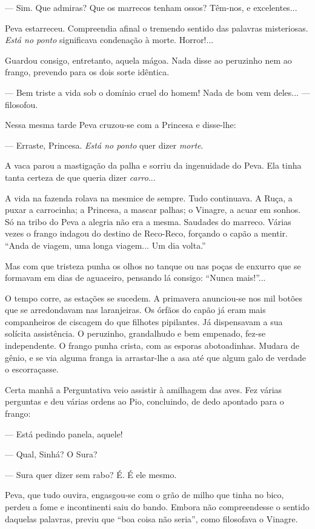 --- Sim. Que admiras? Que os marrecos tenham ossos? Têm-nos, e
excelentes...

Peva estarreceu. Compreendia afinal o tremendo sentido das palavras
misteriosas. \emph{Está no ponto} significava condenação à morte.
Horror!...

Guardou consigo, entretanto, aquela mágoa. Nada disse ao peruzinho nem
ao frango, prevendo para os dois sorte idêntica.

--- Bem triste a vida sob o domínio cruel do homem! Nada de bom vem
deles... --- filosofou.

Nessa mesma tarde Peva cruzou-se com a Princesa e disse-lhe:

--- Erraste, Princesa. \emph{Está no ponto} quer dizer \emph{morte}.

A vaca parou a mastigação da palha e sorriu da ingenuidade do Peva. Ela
tinha tanta certeza de que queria dizer \emph{carro}...

A vida na fazenda rolava na mesmice de sempre. Tudo continuava. A Ruça,
a puxar a carrocinha; a Princesa, a mascar palhas; o Vinagre, a acuar em
sonhos. Só na tribo do Peva a alegria não era a mesma. Saudades do
marreco. Várias vezes o frango indagou do destino de Reco-Reco, forçando
o capão a mentir. ``Anda de viagem, uma longa viagem... Um dia volta.''

Mas com que tristeza punha os olhos no tanque ou nas poças de enxurro
que se formavam em dias de aguaceiro, pensando lá consigo: ``Nunca
mais!''...

O tempo corre, as estações se sucedem. A primavera anunciou-se nos mil
botões que se arredondavam nas laranjeiras. Os órfãos do capão já eram
mais companheiros de ciscagem do que filhotes pipilantes. Já dispensavam
a sua solícita assistência. O peruzinho, grandalhudo e bem empenado,
fez-se independente. O frango punha crista, com as esporas abotoadinhas.
Mudara de gênio, e se via alguma franga ia arrastar-lhe a asa até que
algum galo de verdade o escorraçasse.

Certa manhã a Perguntativa veio assistir à amilhagem das aves. Fez
várias perguntas e deu várias ordens ao Pio, concluindo, de dedo
apontado para o frango:

--- Está pedindo panela, aquele!

--- Qual, Sinhá? O Sura?

--- Sura quer dizer sem rabo? É. É ele mesmo.

Peva, que tudo ouvira, engasgou-se com o grão de milho que tinha no
bico, perdeu a fome e incontinenti saiu do bando. Embora não
compreendesse o sentido daquelas palavras, previu que ``boa coisa não
seria'', como filosofava o Vinagre.

